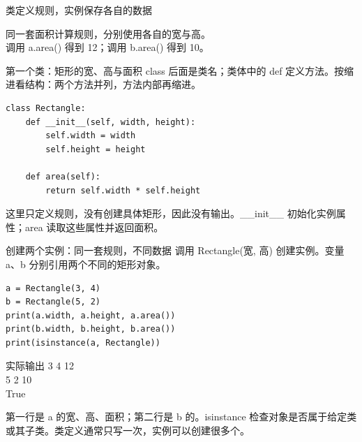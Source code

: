 \documentclass[9pt]{ctexbeamer}
\begin{document}
\begin{frame}{类定义规则，实例保存各自的数据}

\centering
{}
\par\vspace{0.6cm}
同一套面积计算规则，分别使用各自的宽与高。\\
调用 a.area() 得到 12；调用 b.area() 得到 10。

\end{frame}

\begin{frame}[fragile]{第一个类：矩形的宽、高与面积}
class 后面是类名；类体中的 def 定义方法。按缩进看结构：两个方法并列，方法内部再缩进。
\begin{lstlisting}
class Rectangle:
    def __init__(self, width, height):
        self.width = width
        self.height = height

    def area(self):
        return self.width * self.height
\end{lstlisting}
\small 这里只定义规则，没有创建具体矩形，因此没有输出。\_\_init\_\_ 初始化实例属性；area 读取这些属性并返回面积。
\par{}

\end{frame}

\begin{frame}[fragile]{创建两个实例：同一套规则，不同数据}
调用 Rectangle(宽, 高) 创建实例。变量 a、b 分别引用两个不同的矩形对象。
\begin{lstlisting}
a = Rectangle(3, 4)
b = Rectangle(5, 2)
print(a.width, a.height, a.area())
print(b.width, b.height, b.area())
print(isinstance(a, Rectangle))
\end{lstlisting}
\begin{exampleblock}{实际输出}
{\ttfamily\small 3 4 12\\
5 2 10\\
True}
\end{exampleblock}
\small 第一行是 a 的宽、高、面积；第二行是 b 的。isinstance 检查对象是否属于给定类或其子类。类定义通常只写一次，实例可以创建很多个。
\par{}

\end{frame}
\end{document}
